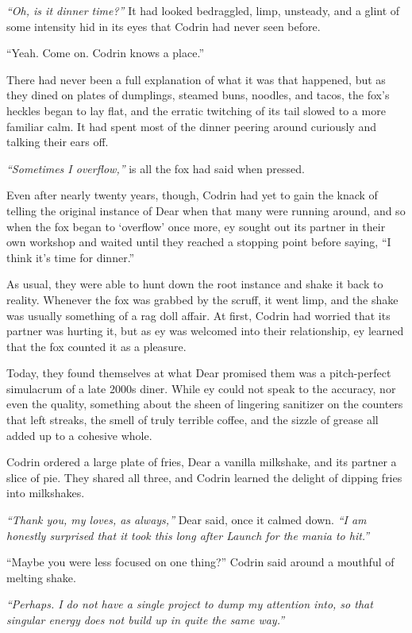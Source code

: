 \emph{``Oh, is it dinner time?''} It had looked bedraggled, limp, unsteady, and a glint of some intensity hid in its eyes that Codrin had never seen before.

``Yeah. Come on. Codrin knows a place.''

There had never been a full explanation of what it was that happened, but as they dined on plates of dumplings, steamed buns, noodles, and tacos, the fox's heckles began to lay flat, and the erratic twitching of its tail slowed to a more familiar calm. It had spent most of the dinner peering around curiously and talking their ears off.

\emph{``Sometimes I overflow,''} is all the fox had said when pressed.

Even after nearly twenty years, though, Codrin had yet to gain the knack of telling the original instance of Dear when that many were running around, and so when the fox began to `overflow' once more, ey sought out its partner in their own workshop and waited until they reached a stopping point before saying, ``I think it's time for dinner.''

As usual, they were able to hunt down the root instance and shake it back to reality. Whenever the fox was grabbed by the scruff, it went limp, and the shake was usually something of a rag doll affair. At first, Codrin had worried that its partner was hurting it, but as ey was welcomed into their relationship, ey learned that the fox counted it as a pleasure.

Today, they found themselves at what Dear promised them was a pitch-perfect simulacrum of a late 2000s diner. While ey could not speak to the accuracy, nor even the quality, something about the sheen of lingering sanitizer on the counters that left streaks, the smell of truly terrible coffee, and the sizzle of grease all added up to a cohesive whole.

Codrin ordered a large plate of fries, Dear a vanilla milkshake, and its partner a slice of pie. They shared all three, and Codrin learned the delight of dipping fries into milkshakes.

\emph{``Thank you, my loves, as always,''} Dear said, once it calmed down. \emph{``I am honestly surprised that it took this long after Launch for the mania to hit.''}

``Maybe you were less focused on one thing?'' Codrin said around a mouthful of melting shake.

\emph{``Perhaps. I do not have a single project to dump my attention into, so that singular energy does not build up in quite the same way.''}

